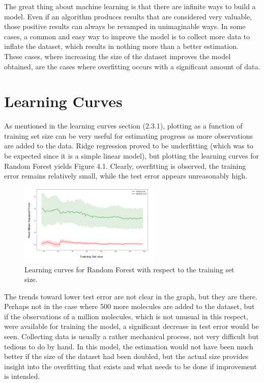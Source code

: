 \hspace{1.5cm}The great thing about machine learning is that there are infinite ways to build a model. Even if an algorithm produces results that are considered very valuable, those positive results can always be revamped in unimaginable ways. In some cases, a common and easy way to improve the model is to collect more data to inflate the dataset, which results in nothing more than a better estimation.\\

These cases, where increasing the size of the dataset improves the model obtained, are the cases where overfitting occurs with a significant amount of data.

\section*{Learning Curves}
As mentioned in the learning curves section (2.3.1), plotting as a function of training set size can be very useful for estimating progress as more observations are added to the data. Ridge regression proved to be underfitting (which was to be expected since it is a simple linear model), but plotting the learning curves for Random Forest yields Figure 4.1. Clearly, overfitting is observed, the training error remains relatively small, while the test error appears unreasonably high.
\begin{figure}
    \centering
    \includegraphics[width=0.6\textwidth]{Images/Discussion/Learningcurve.png}
    \caption{Learning curves for Random Forest with respect to the training set size.}
\end{figure} 

The trends toward lower test error are not clear in the graph, but they are there. Perhaps not in the case where 500 more molecules are added to the dataset, but if the observations of a million molecules, which is not unusual in this respect, were available for training the model, a significant decrease in test error would be seen. Collecting data is usually a rather mechanical process, not very difficult but tedious to do by hand. In this model, the estimation would not have been much better if the size of the dataset had been doubled, but the actual size provides insight into the overfitting that exists and what needs to be done if improvement is intended.\\\\

